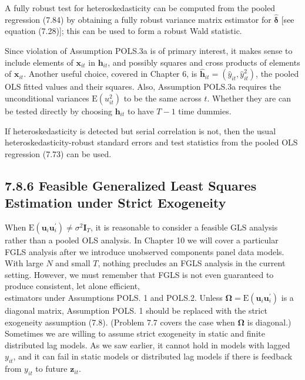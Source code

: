 \documentclass[10pt]{article}
\begin{document}
A fully robust test for heteroskedasticity can be computed from the pooled regression (7.84) by obtaining a fully robust variance matrix estimator for $\hat{\boldsymbol{\delta}}$ [see equation (7.28)]; this can be used to form a robust Wald statistic.

Since violation of Assumption POLS.3a is of primary interest, it makes sense to include elements of $\mathbf{x}_{i t}$ in $\mathbf{h}_{i t}$, and possibly squares and cross products of elements of $\mathbf{x}_{i t}$. Another useful choice, covered in Chapter 6, is $\hat{\mathbf{h}}_{i t}=\left(\hat{y}_{i t}, \hat{y}_{i t}^{2}\right)$, the pooled OLS fitted values and their squares. Also, Assumption POLS.3a requires the unconditional variances $\mathrm{E}\left(u_{i t}^{2}\right)$ to be the same across $t$. Whether they are can be tested directly by choosing $\mathbf{h}_{i t}$ to have $T-1$ time dummies.

If heteroskedasticity is detected but serial correlation is not, then the usual heteroskedasticity-robust standard errors and test statistics from the pooled OLS regression (7.73) can be used.

\subsection*{7.8.6 Feasible Generalized Least Squares Estimation under Strict Exogeneity}
When $\mathrm{E}\left(\mathbf{u}_{i} \mathbf{u}_{i}^{\prime}\right) \neq \sigma^{2} \mathbf{I}_{T}$, it is reasonable to consider a feasible GLS analysis rather than a pooled OLS analysis. In Chapter 10 we will cover a particular FGLS analysis after we introduce unobserved components panel data models. With large $N$ and small $T$, nothing precludes an FGLS analysis in the current setting. However, we must remember that FGLS is not even guaranteed to produce consistent, let alone efficient,\\
estimators under Assumptions POLS. 1 and POLS.2. Unless $\boldsymbol{\Omega}=\mathrm{E}\left(\mathbf{u}_{i} \mathbf{u}_{i}^{\prime}\right)$ is a diagonal matrix, Assumption POLS. 1 should be replaced with the strict exogeneity assumption (7.8). (Problem 7.7 covers the case when $\boldsymbol{\Omega}$ is diagonal.) Sometimes we are willing to assume strict exogeneity in static and finite distributed lag models. As we saw earlier, it cannot hold in models with lagged $y_{i t}$, and it can fail in static models or distributed lag models if there is feedback from $y_{i t}$ to future $\mathbf{z}_{i t}$.
\end{document}
